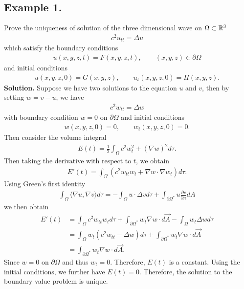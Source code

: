 \documentclass[12pt, a4paper]{article}
\begin{document}
\begin{spacing}{1.1}



\section*{Example 1.}


Prove the uniqueness of solution of the three dimensional wave on $\Omega\subset\mathbb{R}^3$
\begin{align*}
c^2u_{tt} = \Delta u
\end{align*}
which satisfy the boundary conditions
\begin{align*}
u(x, y, z, t) = F(x, y, z, t), \qquad (x, y, z)\in \partial \Omega
\end{align*}
and initial conditions
\begin{align*}
u(x, y, z, 0) = G(x, y, z), \qquad u_t(x, y, z, 0) = H(x, y, z).
\end{align*}
\textbf{Solution.} Suppose we have two solutions to the equation $u$ and $v$, then by setting $w = v - u$, we have
\begin{align*}
c^2w_{tt} = \Delta w
\end{align*}
with boundary condition $w = 0$ on $\partial \Omega$ and initial conditions
\begin{align*}
w(x, y, z, 0) = 0, \qquad w_t(x, y, z, 0) = 0.
\end{align*}
Then consider the volume integral
\begin{align*}
E(t) = \frac{1}{2}\int_{\Omega} c^2 w_t^2 + (\nabla w)^2 d\tau.
\end{align*}
Then taking the derivative with respect to $t$, we obtain
\begin{align*}
E'(t) = \int_{\Omega} \left(c^2 w_{tt}w_t + \nabla w\cdot\nabla w_t\right) d\tau.
\end{align*}
Using Green's first identity
\begin{align*}
\int_{\Omega}\langle \nabla u, \nabla v\rangle d\tau = -\int_{\Omega} u\cdot\Delta v d\tau + \int_{\partial \Omega^*} u\frac{\partial v}{\partial n}dA
\end{align*}
we then obtain
\begin{align*}
E'(t) & = \int_{\Omega} c^2 w_{tt}w_t d\tau + \int_{\partial \Omega^*} w_t\nabla w \cdot d\vec{A} - \int_{\Omega}w_t \Delta w d\tau \\
& = \int_{\Omega}w_t(c^2 w_{tt} - \Delta w) d\tau + \int_{\partial \Omega^*} w_t\nabla w \cdot d\vec{A} \\
& = \int_{\partial \Omega^*} w_t\nabla w \cdot d\vec{A}.
\end{align*}
Since $w = 0$ on $\partial\Omega$ and thus $w_t = 0$. Therefore, $E(t)$ is a constant. Using the initial conditions, we further have $E(t) = 0$. Therefore, the solution to the boundary value problem is unique.



\end{spacing}
\end{document}
